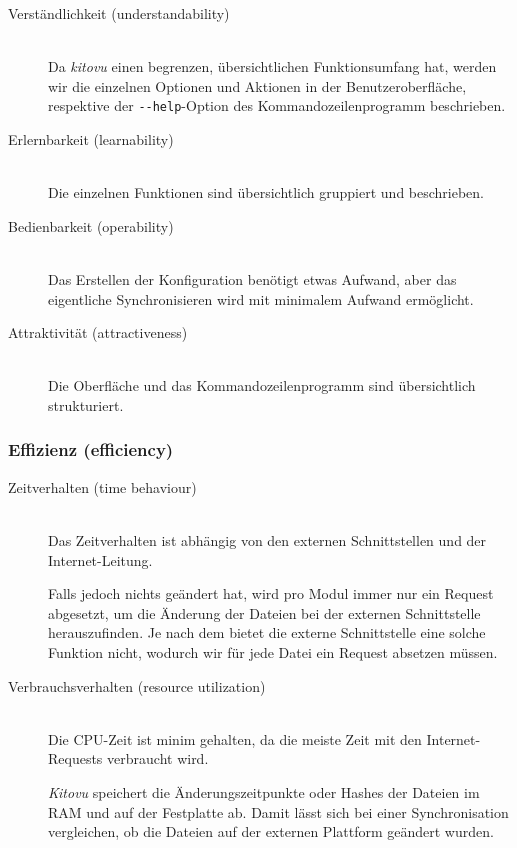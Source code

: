 \documentclass[a4paper]{article}
\begin{document}
\begin{description}
  \item[Verständlichkeit (understandability)] \strut \\
    Da \emph{kitovu} einen begrenzen, übersichtlichen Funktionsumfang hat, werden wir die einzelnen Optionen und Aktionen in der Benutzeroberfläche, respektive der \verb|--help|-Option des Kommandozeilenprogramm beschrieben.
  \item[Erlernbarkeit (learnability)] \strut \\
    Die einzelnen Funktionen sind übersichtlich gruppiert und beschrieben.
  \item[Bedienbarkeit (operability)] \strut \\
    Das Erstellen der Konfiguration benötigt etwas Aufwand, aber das eigentliche Synchronisieren wird mit minimalem Aufwand ermöglicht.
  \item[Attraktivität (attractiveness)] \strut \\
    Die Oberfläche und das Kommandozeilenprogramm sind übersichtlich strukturiert.
\end{description}

\subsubsection{Effizienz (efficiency)}

\begin{description}
  \item[Zeitverhalten (time behaviour)] \strut \\
    Das Zeitverhalten ist abhängig von den externen Schnittstellen und der Internet-Leitung.

    Falls jedoch nichts geändert hat, wird pro Modul immer nur ein Request abgesetzt, um die Änderung der Dateien bei der externen Schnittstelle herauszufinden.
    Je nach dem bietet die externe Schnittstelle eine solche Funktion nicht, wodurch wir für jede Datei ein Request absetzen müssen.
  \item[Verbrauchsverhalten (resource utilization)] \strut \\
    Die CPU-Zeit ist minim gehalten, da die meiste Zeit mit den Internet-Requests verbraucht wird.

    \emph{Kitovu} speichert die Änderungszeitpunkte oder Hashes der Dateien im RAM und auf der Festplatte ab. Damit lässt sich bei einer Synchronisation vergleichen, ob die Dateien auf der externen Plattform geändert wurden.
\end{description}
\end{document}
